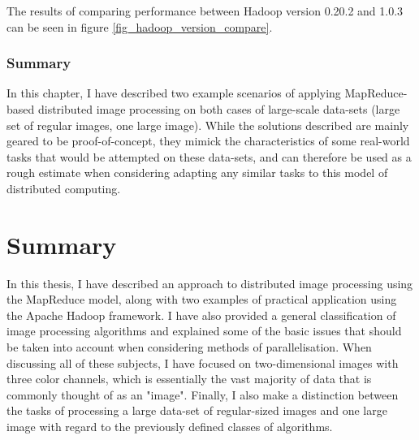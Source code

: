 \documentclass [12pt,a4paper]{report}
\begin{document}
The results of comparing performance between Hadoop version 0.20.2 and 1.0.3 can be seen in figure \ref{fig_hadoop_version_compare}.

\subsection{Summary}

In this chapter, I have described two example scenarios of applying MapReduce-based distributed image processing on both cases of large-scale data-sets (large set of regular images, one large image). While the solutions described are mainly geared to be proof-of-concept, they mimick the characteristics of some real-world tasks that would be attempted on these data-sets, and can therefore be used as a rough estimate when considering adapting any similar tasks to this model of distributed computing.



\chapter{Summary}

In this thesis, I have described an approach to distributed image processing using the MapReduce model, along with two examples of practical application using the Apache Hadoop framework. I have also provided a general classification of image processing algorithms and explained some of the basic issues that should be taken into account when considering methods of parallelisation. When discussing all of these subjects, I have focused on two-dimensional images with three color channels, which is essentially the vast majority of data that is commonly thought of as an "image". Finally, I also make a distinction between the tasks of processing a large data-set of regular-sized images and one large image with regard to the previously defined classes of algorithms.
 
\end{document}
